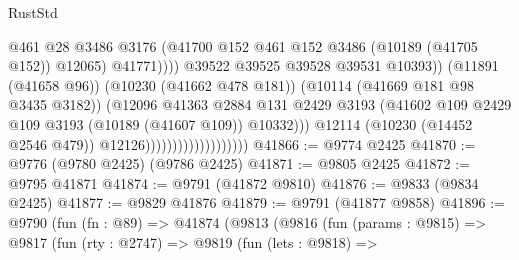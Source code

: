 \begin{lexlean}{RustStd}
\begin{coremodule}
                                                        @461
                                                        @28
                                                        @3486
                                                        @3176
                                                        (@41700
                                                          @152
                                                          @461
                                                          @152
                                                          @3486
                                                          (@10189 (@41705 @152))
                                                          @12065)
                                                        @41771))))
                                                @39522
                                                @39525
                                                @39528
                                                @39531
                                                @10393))
                                            (@11891 (@41658 @96))
                                            (@10230 (@41662 @478 @181))
                                            (@10114 (@41669 @181 @98 @3435 @3182))
                                            (@12096
                                              @41363
                                              @2884
                                              @131
                                              @2429
                                              @3193
                                              (@41602
                                                @109
                                                @2429
                                                @109
                                                @3193
                                                (@10189 (@41607 @109))
                                                @10332)))
                                          @12114
                                          (@10230 (@14452 @2546 @479))
                                          @12126)))))))))))))))))))
@41866 := @9774 @2425
@41870 := @9776 (@9780 @2425) (@9786 @2425)
@41871 := @9805 @2425
@41872 := @9795 @41871
@41874 := @9791 (@41872 @9810)
@41876 := @9833 (@9834 @2425)
@41877 := @9829 @41876
@41879 := @9791 (@41877 @9858)
@41896 := @9790
    (fun (fn : @89) =>
    @41874
      (@9813
        (@9816
          (fun (params : @9815) =>
          @9817
            (fun (rty : @2747) =>
            @9819
              (fun (lets : @9818) =>

\end{coremodule}
\end{lexlean}
